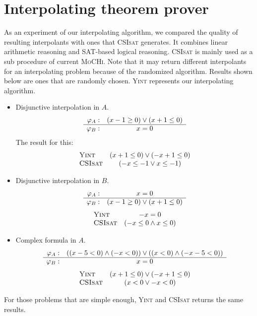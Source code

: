 \section{Interpolating theorem prover}

As an experiment of our interpolating algorithm, we compared the
quality of resulting interpolants with
ones that \textsc{CSIsat} \cite{conf/cav/BeyerZM08} generates.
It combines linear arithmetic reasoning and SAT-based logical reasoning.
\textsc{CSIsat} is mainly used as a sub procedure of current \textsc{MoCHi}.  Note that
it may return different interpolants for an interpolating problem
because of the randomized algorithm.  Results shown below
are ones that are randomly chosen.
\textsc{Yint} represents our interpolating algorithm.

\begin{itemize}
\item Disjunctive interpolation in $A$.
\[\begin{array}{r c}
\varphi_A : & (x-1 \geq 0) \vee (x+1 \leq 0) \\
\hline
\varphi_B : & x=0
\end{array}\]
The result for this:
\[\begin{array}{l c}
\text{\textsc{Yint}} & (x+1 \leq 0) \vee (-x+1 \leq 0) \\
\text{\textsc{CSIsat}} & (-x \leq -1 \vee x \leq -1)
\end{array}\]
\item Disjunctive interpolation in $B$.
\[\begin{array}{r c}
\varphi_A : & x=0 \\
\hline
\varphi_B : & (x-1 \geq 0) \vee (x+1 \leq 0)
\end{array}\]
\[\begin{array}{l c}
\text{\textsc{Yint}} & -x=0 \\
\text{\textsc{CSIsat}} & (-x \leq 0 \wedge x \leq 0)
\end{array}\]
\item Complex formula in $A$.
\[\begin{array}{r c}
\varphi_A : & ((x-5<0) \wedge (-x<0)) \vee ((x<0) \wedge (-x-5<0)) \\
\hline
\varphi_B : & x=0
\end{array}\]
\[\begin{array}{l c}
\text{\textsc{Yint}} & (x+1 \leq 0) \vee (-x+1 \leq 0) \\
\text{\textsc{CSIsat}} & (x < 0 \vee -x < 0)
\end{array}\]
\end{itemize}
For those problems that are simple enough, \textsc{Yint} and \textsc{CSIsat} returns the
same results.

